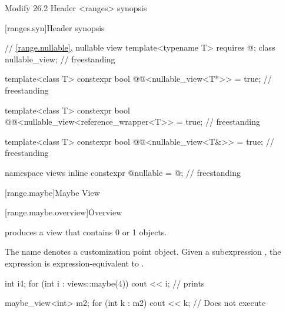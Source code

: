 \documentclass[a4paper,10pt,oneside,openany,final,article]{memoir}
\begin{document}
\begin{wording}


Modify 26.2 Header <ranges> synopsis

[ranges.syn]{Header  synopsis}

\begin{adjustwidth}{1cm}{1cm}
  \begin{addedblock}
    \begin{codeblock}
// \ref{range.nullable}, nullable view
template<typename T>
requires @\seebelow@;
class nullable_view;                                       // freestanding

template<class T>
constexpr bool
@@<nullable_view<T*>> = true;  // freestanding

template<class T>
constexpr bool
@@<nullable_view<reference_wrapper<T>> = true;  // freestanding

template<class T>
constexpr bool
@@<nullable_view<T&>> = true;  // freestanding

namespace views {
  inline constexpr @\unspec@ nullable = @\unspec@;          // freestanding
}



    \end{codeblock}
  \end{addedblock}
\end{adjustwidth}

[range.maybe]{Maybe View}

[range.maybe.overview]{Overview}

\pnum
{} produces a view that contains 0 or 1 objects.


\pnum
{}%
The name  denotes a
customization point object.
Given a subexpression , the expression
 is expression-equivalent to
.


\begin{example}
  \begin{codeblock}
int i{4};
for (int i : views::maybe(4))
  cout << i;        // prints 

maybe_view<int> m2{};
for (int k : m2)
  cout << k;        // Does not execute
\end{codeblock}
\end{example}


\end{wording}
\end{document}
